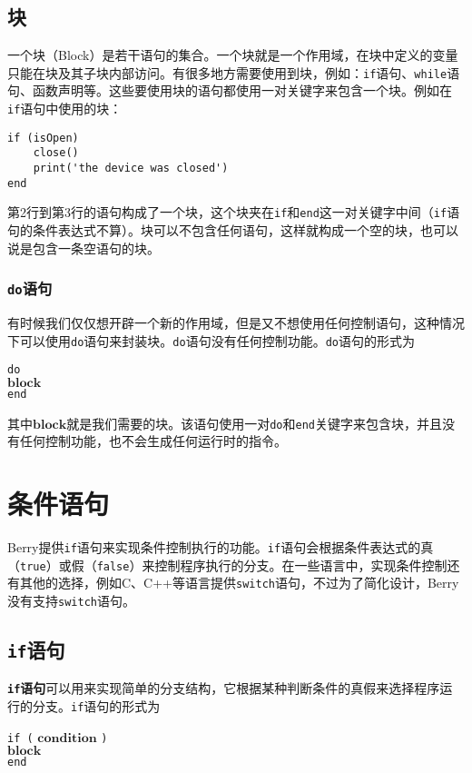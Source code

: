 \subsection{块}

一个块（Block）是若干语句的集合。一个块就是一个作用域，在块中定义的变量只能在块及其子块内部访问。有很多地方需要使用到块，例如：\texttt{if}语句、\texttt{while}语句、函数声明等。这些要使用块的语句都使用一对关键字来包含一个块。例如在\texttt{if}语句中使用的块：
\begin{lstlisting}[language=berry]
if (isOpen)
    close()
    print('the device was closed')
end
\end{lstlisting}
第2行到第3行的语句构成了一个块，这个块夹在\texttt{if}和\texttt{end}这一对关键字中间（\texttt{if}语句的条件表达式不算）。块可以不包含任何语句，这样就构成一个空的块，也可以说是包含一条空语句的块。

\subsubsection{\texttt{do}语句}

有时候我们仅仅想开辟一个新的作用域，但是又不想使用任何控制语句，这种情况下可以使用\texttt{do}语句来封装块。\texttt{do}语句没有任何控制功能。\texttt{do}语句的形式为
\begin{algorithm}
    \texttt{do}\\
    \qquad $\bm{block}$ \\
    \texttt{end}
\end{algorithm}
其中$\bm{block}$就是我们需要的块。该语句使用一对\texttt{do}和\texttt{end}关键字来包含块，并且没有任何控制功能，也不会生成任何运行时的指令。

\section{条件语句}

Berry提供\texttt{if}语句来实现条件控制执行的功能。\texttt{if}语句会根据条件表达式的真（\texttt{true}）或假（\texttt{false}）来控制程序执行的分支。在一些语言中，实现条件控制还有其他的选择，例如C、C++等语言提供\texttt{switch}语句，不过为了简化设计，Berry没有支持\texttt{switch}语句。

\subsection{\texttt{if}语句}

\textbf{\texttt{if}语句}可以用来实现简单的分支结构，它根据某种判断条件的真假来选择程序运行的分支。\texttt{if}语句的形式为
\begin{algorithm}
    \texttt{if (} $\bm{condition}$ \texttt{)} \\
    \qquad $\bm{block}$ \\
    \texttt{end}
\end{algorithm}

